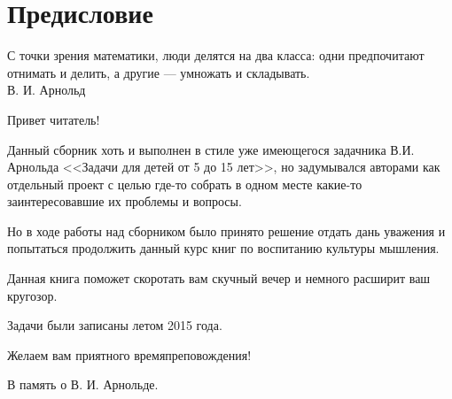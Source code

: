 \chapter*{Предисловие}

\begin{flushright}
{\scriptsize С точки зрения математики, люди делятся на два класса: одни предпочитают отнимать и делить, а другие — умножать и складывать.\\
В. И. Арнольд}
\end{flushright}

Привет читатель!

Данный сборник хоть и выполнен в стиле уже имеющегося задачника
В.И. Арнольда <<Задачи для детей от 5 до 15 лет>>, но задумывался
авторами как отдельный проект с целью где-то собрать в одном месте
какие-то заинтересовавшие их проблемы и вопросы.

Но в ходе работы над сборником было принято решение отдать дань
уважения и попытаться продолжить данный курс книг по воспитанию
культуры мышления.

Данная книга поможет скоротать вам скучный вечер и немного расширит ваш кругозор.

Задачи были записаны летом 2015 года.

Желаем вам приятного времяпреповождения!

В память о В. И. Арнольде.
